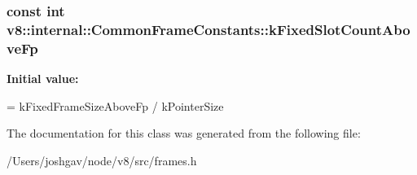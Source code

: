 \subsubsection[{\texorpdfstring{k\+Fixed\+Slot\+Count\+Above\+Fp}{kFixedSlotCountAboveFp}}]{\setlength{\rightskip}{0pt plus 5cm}const int v8\+::internal\+::\+Common\+Frame\+Constants\+::k\+Fixed\+Slot\+Count\+Above\+Fp\hspace{0.3cm}{\ttfamily [static]}}\hypertarget{classv8_1_1internal_1_1_common_frame_constants_acfaf39b4c18f729b06fe2dd0fd215a71}{}\label{classv8_1_1internal_1_1_common_frame_constants_acfaf39b4c18f729b06fe2dd0fd215a71}
{\bfseries Initial value\+:}
\begin{DoxyCode}
=
      kFixedFrameSizeAboveFp / kPointerSize
\end{DoxyCode}


The documentation for this class was generated from the following file\+:\begin{DoxyCompactItemize}
\item 
/\+Users/joshgav/node/v8/src/frames.\+h\end{DoxyCompactItemize}
